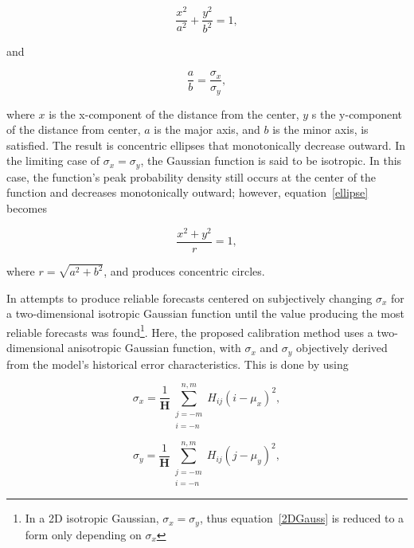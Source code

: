     \begin{equation}
        \label{ellipse}
        \frac{x^2}{a^2} + \frac{y^2}{b^2} = 1,
    \end{equation}

\noindent and

    \begin{equation}
        \frac{a}{b} = \frac{\sigma_x}{\sigma_y},
    \end{equation}

\noindent where $x$ is the x-component of the distance from the center, $y$ s the y-component of the distance from center, $a$ is the major axis, and $b$ is the minor axis, is satisfied.
The result is concentric ellipses that monotonically decrease outward.
In the limiting case of $\sigma_x = \sigma_y$, the Gaussian function is said to be isotropic.
In this case, the function's peak probability density still occurs at the center of the function and decreases monotonically outward; however, \mbox{equation \ref{ellipse}} becomes

    \begin{equation*}
        \frac{x^2 + y^2}{r} = 1,
    \end{equation*}

\noindent where $r = \sqrt{a^2 + b^2}$, and produces concentric circles.

In \cite{Sobash2011} attempts to produce reliable forecasts centered on subjectively changing $\sigma_x$ for a two-dimensional isotropic Gaussian function until the value producing the most reliable forecasts was found\footnote{In a 2D isotropic Gaussian, $\sigma_x = \sigma_y$, thus \mbox{equation \ref{2DGauss}} is reduced to a form only depending on $\sigma_x$}.
Here, the proposed calibration method uses a two-dimensional anisotropic Gaussian function, with $\sigma_x$ and $\sigma_y$ objectively derived from the model's historical error characteristics.
This is done by using

    \begin{equation}
        \label{sigmax}
        \sigma_x = \frac{1}{\mathbf{H}} \sum\limits_{\substack{j=-m \\ i=-n}}^{n,m}H_{ij}(i - \mu_x)^2,
    \end{equation}

    \begin{equation}
        \label{sigmay}
        \sigma_y = \frac{1}{\mathbf{H}} \sum\limits_{\substack{j=-m \\ i=-n}}^{n,m}H_{ij}(j - \mu_y)^2,
    \end{equation}

